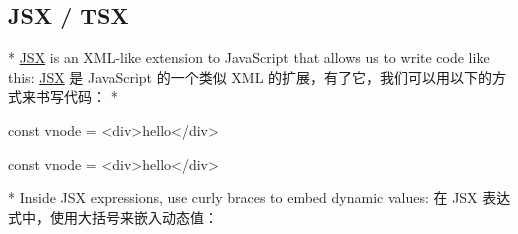 \begin{paracol}{2}
\subsection{JSX / TSX}
\switchcolumn[0]*%
\href{https://facebook.github.io/jsx/}{JSX} is an XML-like extension to
JavaScript that allows us to write code like this:
\switchcolumn
\href{https://facebook.github.io/jsx/}{JSX} 是 JavaScript 的一个类似 XML
的扩展，有了它，我们可以用以下的方式来书写代码：
\switchcolumn[0]*%
\begin{codeHtml}
const vnode = <div>hello</div>
\end{codeHtml}
\switchcolumn
\begin{codeHtml}
const vnode = <div>hello</div>
\end{codeHtml}
\switchcolumn[0]*%
Inside JSX expressions, use curly braces to embed dynamic values:
\switchcolumn
在 JSX 表达式中，使用大括号来嵌入动态值：
\end{paracol}


